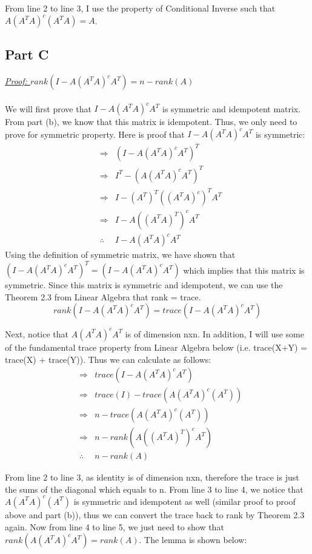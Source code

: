 \documentclass{article}
\begin{document}
\noindent From line 2 to line 3, I use the property of Conditional Inverse such that $A(A^TA)^c(A^TA) = A$.

\subsection{Part C}
\textit{\underline{Proof: }} $rank(I-A(A^TA)^cA^T) = n - rank(A)$ \\ \\
We will first prove that $I-A(A^TA)^cA^T$ is symmetric and idempotent matrix. From part (b), we know that this matrix is idempotent. Thus, we only need to prove for symmetric property. Here is proof that $I-A(A^TA)^cA^T$ is symmetric:
\begin{eqnarray*}
  &\Rightarrow& (I - A(A^TA)^cA^T)^T \\
  &\Rightarrow&  I^T - (A(A^TA)^cA^T)^T \\
  &\Rightarrow&  I - (A^T)^T((A^TA)^c)^TA^T \\
  &\Rightarrow&  I - A((A^TA)^T)^cA^T \\
  &\therefore&  I - A(A^TA)^cA^T
\end{eqnarray*}
\noindent Using the definition of symmetric matrix, we have shown that $(I - A(A^TA)^cA^T)^T = (I - A(A^TA)^cA^T)$ which implies that this matrix is symmetric. Since this matrix is symmetric and idempotent, we can use the Theorem 2.3 from Linear Algebra that rank = trace.
\begin{equation*}
  rank(I - A(A^TA)^cA^T) = trace(I - A(A^TA)^cA^T)
\end{equation*}

\noindent Next, notice that $A(A^TA)^cA^T$ is of dimension nxn. In addition, I will use some of the fundamental trace property from Linear Algebra below (i.e. trace(X+Y) = trace(X) + trace(Y)). Thus we can calculate as follows:
\begin{eqnarray*}
  &\Rightarrow& trace(I - A(A^TA)^cA^T) \\
  &\Rightarrow& trace(I) - trace(A(A^TA)^c(A^T)) \\
  &\Rightarrow& n - trace(A(A^TA)^c(A^T)) \\
  &\Rightarrow&  n - rank(A((A^TA)^T)^cA^T) \\
  &\therefore&  n - rank(A)
\end{eqnarray*}

\noindent From line 2 to line 3, as identity is of dimension nxn, therefore the trace is just the sums of the diagonal which equals to n. From line 3 to line 4, we notice that $A(A^TA)^c(A^T)$ is symmetric and idempotent as well (similar proof to proof above and part (b)), thus we can convert the trace back to rank by Theorem 2.3 again. Now from line 4 to line 5, we just need to show that $rank(A(A^TA)^cA^T) = rank(A)$. The lemma is shown below:
\end{document}
